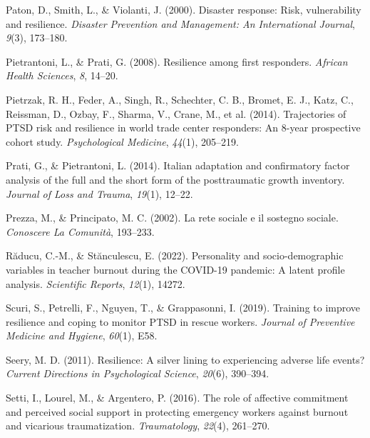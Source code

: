 \documentclass[
  man,floatsintext]{apa7}
\newlength{\cslhangindent}
\newlength{\cslentryspacingunit} %
\newenvironment{CSLReferences}[2] %
 {%
  \setlength{\parindent}{0pt}
  \ifodd #1
  \let\oldpar\par
  \def\par{\hangindent=\cslhangindent\oldpar}
  \fi
  \setlength{\parskip}{#2\cslentryspacingunit}
 }%
 {}
\begin{document}
\begin{CSLReferences}{1}{0}
\leavevmode{}%
Paton, D., Smith, L., \& Violanti, J. (2000). Disaster response: Risk, vulnerability and resilience. \emph{Disaster Prevention and Management: An International Journal}, \emph{9}(3), 173--180.

\leavevmode{}%
Pietrantoni, L., \& Prati, G. (2008). Resilience among first responders. \emph{African Health Sciences}, \emph{8}, 14--20.

\leavevmode{}%
Pietrzak, R. H., Feder, A., Singh, R., Schechter, C. B., Bromet, E. J., Katz, C., Reissman, D., Ozbay, F., Sharma, V., Crane, M., et al. (2014). Trajectories of PTSD risk and resilience in world trade center responders: An 8-year prospective cohort study. \emph{Psychological Medicine}, \emph{44}(1), 205--219.

\leavevmode{}%
Prati, G., \& Pietrantoni, L. (2014). Italian adaptation and confirmatory factor analysis of the full and the short form of the posttraumatic growth inventory. \emph{Journal of Loss and Trauma}, \emph{19}(1), 12--22.

\leavevmode{}%
Prezza, M., \& Principato, M. C. (2002). La rete sociale e il sostegno sociale. \emph{Conoscere La Comunit{à}}, 193--233.

\leavevmode{}%
Răducu, C.-M., \& Stănculescu, E. (2022). Personality and socio-demographic variables in teacher burnout during the COVID-19 pandemic: A latent profile analysis. \emph{Scientific Reports}, \emph{12}(1), 14272.

\leavevmode{}%
Scuri, S., Petrelli, F., Nguyen, T., \& Grappasonni, I. (2019). Training to improve resilience and coping to monitor PTSD in rescue workers. \emph{Journal of Preventive Medicine and Hygiene}, \emph{60}(1), E58.

\leavevmode{}%
Seery, M. D. (2011). Resilience: A silver lining to experiencing adverse life events? \emph{Current Directions in Psychological Science}, \emph{20}(6), 390--394.

\leavevmode{}%
Setti, I., Lourel, M., \& Argentero, P. (2016). The role of affective commitment and perceived social support in protecting emergency workers against burnout and vicarious traumatization. \emph{Traumatology}, \emph{22}(4), 261--270.


\end{CSLReferences}
\end{document}
